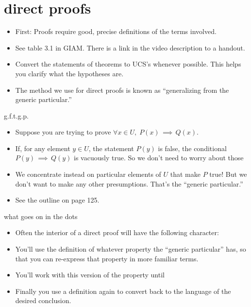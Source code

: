 \documentclass[landscape]{beamer}
\begin{document}
\section{direct proofs}

\begin{frame}{}
\begin{itemize}
\item First: Proofs require good, precise definitions of the terms involved. \pause
\item See table 3.1 in GIAM.  There is a link in the video description to a handout.\pause
\item Convert the statements of theorems to UCS's whenever possible. \pause This helps you clarify what the hypotheses are. \pause
\item The method we use for direct proofs is known as ``generalizing from the generic particular.''

\end{itemize}
\end{frame}

\begin{frame}{g.f.t.g.p.}
\begin{itemize}
\item Suppose you are trying to prove  $\displaystyle \forall x \in U, \; P(x)\, \implies \, Q(x)$. \pause
\item If, for any element $y \in U$, the statement $P(y)$ is false, the conditional $P(y)\, \implies \, Q(y)$ is vacuously true. \pause So we don't need to worry about those\textellipsis \pause
\item We concentrate instead on particular elements of $U$ that make $P$ true! \pause But we don't want to make any other presumptions. \pause That's the ``generic particular.'' \pause
\item See the outline on page 125.
\end{itemize}
\end{frame}

\begin{frame}{what goes on in the dots}
\begin{itemize}
\item Often the interior of a direct proof will have the following character: \pause
\item You'll use the definition of whatever property the ``generic particular'' has, so that you can re-express that property in more familiar terms. \pause
\item You'll work with this version of the property until\textellipsis \pause
\item Finally you use a definition again to convert back to the language of the desired conclusion.
\end{itemize}
\end{frame}
\end{document}
